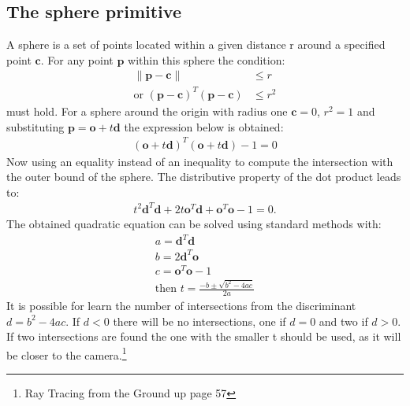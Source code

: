 \subsection{The sphere primitive}
A sphere is a set of points located within a given distance r around a specified point $\mathbf{c}$. For any point $\mathbf{p}$ within this sphere the condition:
\begin{align}
\|\mathbf{p} - \mathbf{c} \| &\leq r \\
\text{or } (\mathbf{p} - \mathbf{c})^T (\mathbf{p} - \mathbf{c}) &\leq r^2
\end{align}
must hold. For a sphere around the origin with radius one $\mathbf{c} = 0$, $r^2 = 1$ and substituting $\mathbf{p} = \mathbf{o} + t\mathbf{d}$ the expression below is obtained:
\begin{align}
(\mathbf{o} + t\mathbf{d})^T (\mathbf{o} + t\mathbf{d}) - 1 = 0 
\end{align}
Now using an equality instead of an inequality to compute the intersection with the outer bound of the sphere. 
The distributive property of the dot product leads to:
\begin{align}
t^2 \mathbf{d}^T \mathbf{d} + 2t\mathbf{o}^T \mathbf{d} + \mathbf{o}^T \mathbf{o} - 1 = 0.
\end{align}
The obtained quadratic equation can be solved using standard methods with:
\begin{align}
a = \mathbf{d}^T \mathbf{d} \\
b = 2\mathbf{d}^T \mathbf{o} \\
c = \mathbf{o}^T \mathbf{o} - 1 \\
\text{then  } t = \frac{-b \pm \sqrt{b^2 - 4ac}}{2a}
\end{align}
It is possible for learn the number of intersections from the discriminant $d = b^2 - 4ac$. If $d < 0$ there will be no intersections, one if $d = 0$ and two if $d > 0$. If two intersections are found the one with the smaller t should be used, as it will be closer to the camera.\footnote{Ray Tracing from the Ground up page 57}

